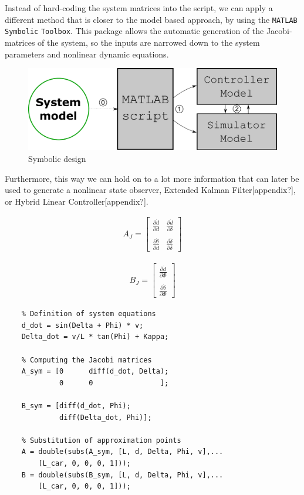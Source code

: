 Instead of hard-coding the system matrices into the script, we can apply a different method that is closer to the model based approach, by using the \verb!MATLAB! \verb!Symbolic! \verb!Toolbox!. This package allows the automatic generation of the Jacobi-matrices of the system, so the inputs are narrowed down to the system parameters and nonlinear dynamic equations.

\begin{figure}[!ht]
    \centering
    \includegraphics[width=0.7\linewidth]{img/symbolic}
    \caption{Symbolic design}
    \label{fig:symbolic}
\end{figure}

Furthermore, this way we can hold on to a lot more information that can later be used to generate a nonlinear state observer, Extended Kalman Filter[appendix?], or Hybrid Linear Controller[appendix?].
     
\begin{minipage}{0.45\linewidth}
    \begin{align}
        A_J =
        \begin{bmatrix}
           \frac{\partial \dot{d}}{\partial d} & \frac{\partial \dot{d}}{\partial \delta} \\
           & \\
           \frac{\partial \dot{\delta}}{\partial d} & \frac{\partial \dot{\delta}}{\partial \delta}
         \end{bmatrix}
     \end{align}
\end{minipage}
\begin{minipage}{0.45\linewidth}
    \begin{align}
        B_J =
         \begin{bmatrix}
               \frac{\partial \dot{d}}{\partial \Phi} \\
               \\
               \frac{\partial \dot{\delta}}{\partial \Phi}
        \end{bmatrix}
     \end{align}
\end{minipage}

\begin{lstlisting}
    % Definition of system equations
    d_dot = sin(Delta + Phi) * v;
    Delta_dot = v/L * tan(Phi) + Kappa;
    
    % Computing the Jacobi matrices
    A_sym = [0      diff(d_dot, Delta);
             0      0                ];
       
    B_sym = [diff(d_dot, Phi);
             diff(Delta_dot, Phi)];
    
    % Substitution of approximation points
    A = double(subs(A_sym, [L, d, Delta, Phi, v],...
        [L_car, 0, 0, 0, 1]));
    B = double(subs(B_sym, [L, d, Delta, Phi, v],...
        [L_car, 0, 0, 0, 1]));
\end{lstlisting}

